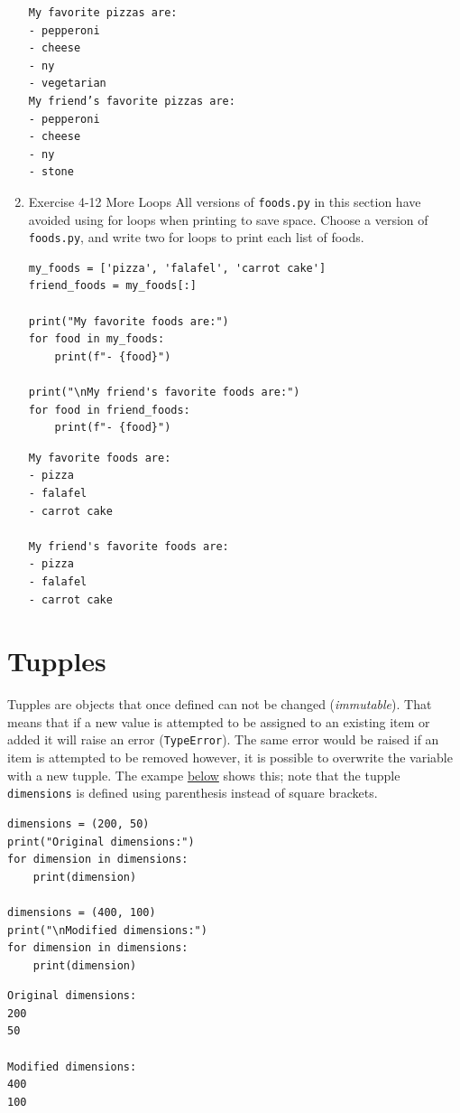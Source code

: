 \documentclass[10pt]{book}
\begin{document}
\begin{enumerate}
\label{org7d5ba5a}
\begin{verbatim}
My favorite pizzas are:
- pepperoni
- cheese
- ny
- vegetarian
My friend’s favorite pizzas are:
- pepperoni
- cheese
- ny
- stone
\end{verbatim}
\item Exercise 4-12 More Loops
\label{sec:orgcd7bb1b}
All versions of \texttt{foods.py} in this section have avoided using for loops when printing to save space. Choose a version of \texttt{foods.py}, and write two for loops to print each list of foods.
\begin{verbatim}
my_foods = ['pizza', 'falafel', 'carrot cake']
friend_foods = my_foods[:]

print("My favorite foods are:")
for food in my_foods:
    print(f"- {food}")

print("\nMy friend's favorite foods are:")
for food in friend_foods:
    print(f"- {food}")
\end{verbatim}

\label{org4a3c5c9}
\begin{verbatim}
My favorite foods are:
- pizza
- falafel
- carrot cake

My friend's favorite foods are:
- pizza
- falafel
- carrot cake
\end{verbatim}
\end{enumerate}
\section{Tupples}
\label{sec:orgc246d32}
Tupples are objects that once defined can not be changed (\emph{immutable}). That means that if a new value is attempted to be assigned to an existing item or added it will raise an error (\texttt{TypeError}). The same error would be raised if an item is attempted to be removed however, it is possible to overwrite the variable with a new tupple. The exampe \hyperref[orgcd4c2ff]{below} shows this; note that the tupple \texttt{dimensions} is  defined using parenthesis instead of square brackets.

\label{orgcd4c2ff}
\begin{verbatim}
dimensions = (200, 50)
print("Original dimensions:")
for dimension in dimensions:
    print(dimension)

dimensions = (400, 100)
print("\nModified dimensions:")
for dimension in dimensions:
    print(dimension)
\end{verbatim}

\label{org2eb5753}
\begin{verbatim}
Original dimensions:
200
50

Modified dimensions:
400
100
\end{verbatim}
\end{document}
